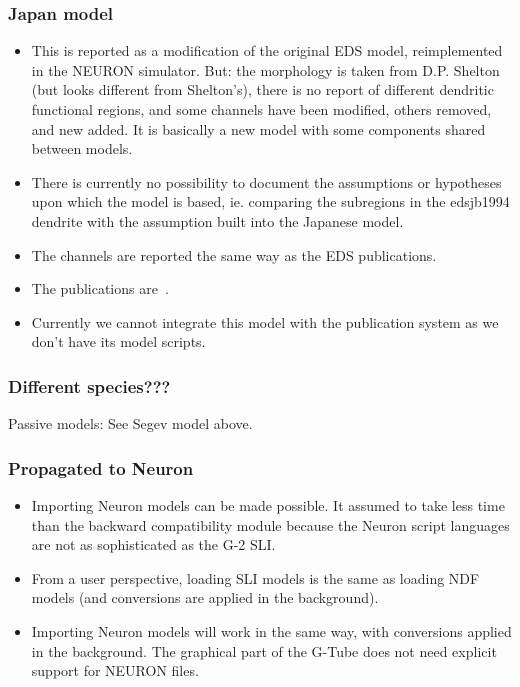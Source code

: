 \documentclass[12pt]{article}
\begin{document}
\subsubsection{Japan model}
\begin{itemize}
\item This is reported as a modification of the original EDS model,
  reimplemented in the NEURON simulator.  But: the morphology is taken
  from D.P. Shelton (but looks different from Shelton's), there is no
  report of different dendritic functional regions, and some channels
  have been modified, others removed, and new added.  It is basically
  a new model with some components shared between models.
\item There is currently no possibility to document the assumptions or
  hypotheses upon which the model is based, ie. comparing the
  subregions in the edsjb1994 dendrite with the assumption built into
  the Japanese model.
\item The channels are reported the same way as the EDS publications.
\item The publications are~\cite{miyasho01:_low_ca2_purkin,
    chono03:_purkin}.
\item Currently we cannot integrate this model with the publication
  system as we don't have its model scripts.
\end{itemize}

\subsubsection{Different species???}
Passive models: See Segev model above.


\subsubsection{Propagated to Neuron}
\begin{itemize}
\item Importing Neuron models can be made possible.  It assumed to
  take less time than the backward compatibility module because the
  Neuron script languages are not as sophisticated as the G-2 SLI.
\item From a user perspective, loading SLI models is the same as
  loading NDF models (and conversions are applied in the background).
\item Importing Neuron models will work in the same way, with
  conversions applied in the background.  The graphical part of the
  G-Tube does not need explicit support for NEURON files.
\end{itemize}
\end{document}
